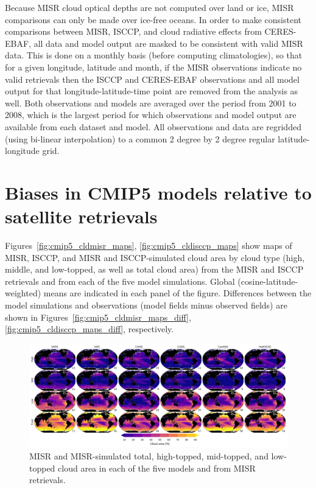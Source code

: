Because MISR cloud optical depths are not computed over land or ice,
MISR comparisons can only be made over ice-free oceans. In order to make
consistent comparisons between MISR, ISCCP, and cloud radiative effects
from CERES-EBAF, all data and model output are masked to be consistent
with valid MISR data. This is done on a monthly basis (before computing
climatologies), so that for a given longitude, latitude and month, if
the MISR observations indicate no valid retrievals then the ISCCP and
CERES-EBAF observations and all model output for that
longitude-latitude-time point are removed from the analysis as well.
Both observations and models are averaged over the period from 2001 to
2008, which is the largest period for which observations and model
output are available from each dataset and model. All observations and
data are regridded (using bi-linear interpolation) to a common 2 degree
by 2 degree regular latitude-longitude grid.

\section{Biases in CMIP5 models relative to satellite
retrievals}\label{biases-in-cmip5-models-relative-to-satellite-retrievals}

Figures~\ref{fig:cmip5_cldmisr_maps}, \ref{fig:cmip5_cldisccp_maps} show
maps of MISR, ISCCP, and MISR and ISCCP-simulated cloud area by cloud
type (high, middle, and low-topped, as well as total cloud area) from
the MISR and ISCCP retrievals and from each of the five model
simulations. Global (cosine-latitude-weighted) means are indicated in
each panel of the figure. Differences between the model simulations and
observations (model fields minus observed fields) are shown in
Figures~\ref{fig:cmip5_cldmisr_maps_diff}, \ref{fig:cmip5_cldisccp_maps_diff},
respectively.

\begin{figure}[htbp]
\centering
\includegraphics{graphics/cmip5_cldmisr.pdf}
\caption{\label{fig:cmip5_cldmisr_maps}MISR and MISR-simulated total,
high-topped, mid-topped, and low-topped cloud area in each of the five
models and from MISR retrievals.}\label{fig:cmip5ux5fcldmisrux5fmaps}
\end{figure}

